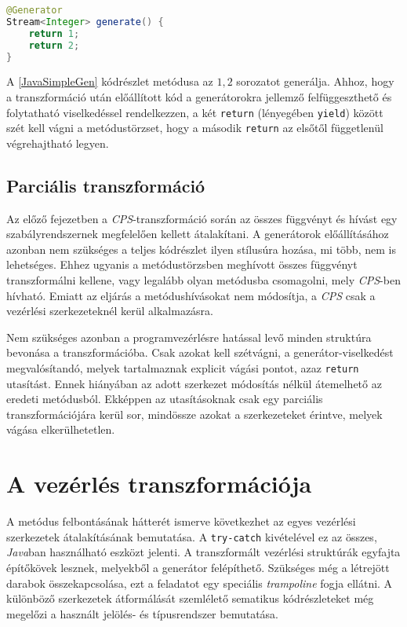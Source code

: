 \begin{lstlisting}[language=Java, caption={Az $1, 2$ sorozatot előállító generátor}, captionpos=b, label=JavaSimpleGen, escapechar=$]
@Generator
Stream<Integer> generate() {
    return 1;
    return 2;
}
\end{lstlisting}

A \ref{JavaSimpleGen} kódrészlet metódusa az $1, 2$ sorozatot generálja. Ahhoz, hogy a transzformáció után előállított kód a generátorokra jellemző felfüggeszthető és folytatható viselkedéssel rendelkezzen, a két \texttt{return} (lényegében \texttt{yield}) között szét kell vágni a metódustörzset, hogy a második \texttt{return} az elsőtől függetlenül végrehajtható legyen.

\subsection{Parciális transzformáció}

Az előző fejezetben a \textit{CPS}-transzformáció során az összes függvényt és hívást egy szabályrendszernek megfelelően kellett átalakítani. A generátorok előállításához azonban nem szükséges a teljes kódrészlet ilyen stílusúra hozása, mi több, nem is lehetséges. Ehhez ugyanis a metódustörzsben meghívott összes függvényt transzformálni kellene, vagy legalább olyan metódusba csomagolni, mely \textit{CPS}-ben hívható. Emiatt az eljárás a metódushívásokat nem módosítja, a \textit{CPS} csak a vezérlési szerkezeteknél kerül alkalmazásra.

Nem szükséges azonban a programvezérlésre hatással levő minden struktúra bevonása a transzformációba. Csak azokat kell szétvágni, a generátor-viselkedést megvalósítandó, melyek tartalmaznak explicit vágási pontot, azaz \texttt{return} utasítást. Ennek hiányában az adott szerkezet módosítás nélkül átemelhető az eredeti metódusból. Ekképpen az utasításoknak csak egy parciális transzformációjára kerül sor, mindössze azokat a szerkezeteket érintve, melyek vágása elkerülhetetlen.

\section{A vezérlés transzformációja}

A metódus felbontásának hátterét ismerve következhet az egyes vezérlési szerkezetek átalakításának bemutatása. A \texttt{try-catch} kivételével ez az összes, \textit{Java}ban használható eszközt jelenti. A transzformált vezérlési struktúrák egyfajta építőkövek lesznek, melyekből a generátor felépíthető. Szükséges még a létrejött darabok összekapcsolása, ezt a feladatot egy speciális \textit{trampoline} fogja ellátni. A különböző szerkezetek átformálását szemlélető sematikus kódrészleteket még megelőzi a használt jelölés- és típusrendszer bemutatása.

